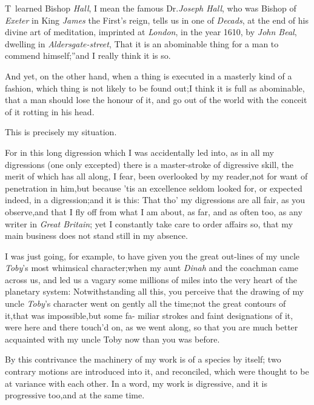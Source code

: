 \documentclass{article}
\begin{document}
\lettrine{T}{\,} learned Bishop \textit{Hall}, I mean\break 
the famous Dr.\@ \textit{Joseph Hall}, who\break
was Bishop of
\textit{Exeter} in King \textit{James} the First’s reign, tells
us in one of \textit{Decads}, at the end of his divine art of
meditation, imprinted at \textit{London}, in the year 1610, by
\textit{John Beal}, dwelling in
\textit{Aldersgate-street},
\noindent \lqq That it is an abominable thing for a man to commend himself;”\tsh  and I
really think it is so.

And yet, on the other hand, when a thing is executed in a
masterly kind of a fashion, which thing is not likely to be found
out;\tsk  I think it is full as abominable, that a man should lose
the honour of it, and go out of the world with the conceit of it
rotting in his head.

This is precisely my situation.

For in this long digression which I was accidentally led into,
as in all my digressions (one only excepted) there is a
master-stroke of digressive skill, the merit of which has all
along, I fear, been overlooked by my reader,\tsk  not for want of
penetration in him,\tsk  but because ’tis an excellence
seldom looked for, or expected indeed, in a digression;\tsk  and
it is this: That tho’ my digressions are all fair, as you
observe,\tsk  and that I fly off from what I am about, as far, and
as often too, as any writer in \textit{Great Britain}; yet I
constantly take care to order affairs so, that my main business does
not stand still in my absence.

I was just going, for example, to have given you the great
out-lines of my uncle \textit{Toby}’s most whimsical
character;\tsk  when my aunt \textit{Dinah} and the coachman came
across us, and led us a vagary some millions of miles into the very
heart of the planetary system: Notwithstanding all this, you
perceive that the drawing of my uncle \textit{Toby}’s character
went on gently all the time;\tsk  not the great contours of
it,\tsk  that was impossible,\tsk  but some fa- miliar strokes and
faint designations of it, were here and there touch’d on, as
we went along, so that you are much better acquainted with my uncle
Toby now than you was before.

By this contrivance the machinery of my work is of a species by
itself; two contrary motions are introduced into it, and
reconciled, which were thought to be at variance with each other.
In a word, my work is digressive, and it is progressive
too,\tsk  and at the same time.
\end{document}
